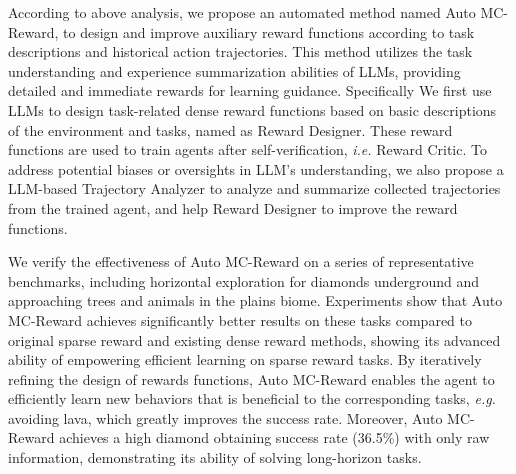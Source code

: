 According to above analysis, we propose an automated method named Auto MC-Reward, to design and improve auxiliary reward functions according to task descriptions and historical action trajectories.
This method utilizes the task understanding and experience summarization abilities of LLMs, providing detailed and immediate rewards for learning guidance. Specifically
We first use LLMs to design task-related dense reward functions based on basic descriptions of the environment and tasks, named as Reward Designer. These reward functions are used to train agents after self-verification, \emph{i.e.} Reward Critic. To address potential biases or oversights in LLM's understanding, we also propose a LLM-based Trajectory Analyzer to analyze and summarize collected trajectories from the trained agent, and help Reward Designer to improve the reward functions. 

We verify the effectiveness of Auto MC-Reward on a series of representative benchmarks, including horizontal exploration for diamonds underground and approaching trees and animals in the plains biome. Experiments show that Auto MC-Reward achieves significantly better results on these tasks compared to original sparse reward and existing dense reward methods, showing its advanced ability of empowering efficient learning on sparse reward tasks. By iteratively refining the design of rewards functions, Auto MC-Reward enables the agent to efficiently learn new behaviors that is beneficial to the corresponding tasks, \emph{e.g.} avoiding lava, which greatly improves the success rate. Moreover, Auto MC-Reward achieves a high diamond obtaining success rate (36.5\%) with only raw information, demonstrating its ability of solving long-horizon tasks.

